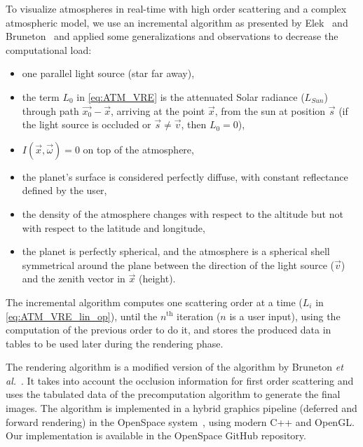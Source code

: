 \documentclass[journal]{vgtc}                %
\newcommand{\etal}{\emph{et al.}}
\newcommand{\review}[1]{{\color{blue}#1}}
\begin{document}
To visualize atmospheres in real-time with high order scattering and a complex atmospheric model, we use an incremental algorithm as presented by Elek~\cite{Elek:2009} and Bruneton~\cite{BrunetonNeyret:2008} and applied some generalizations and observations to decrease the computational load:
\begin{itemize}
	\vspace{-2.5mm}
	\item one parallel light source (star far away),
	\vspace{-2.5mm}
	\item the term $L_0$ in \autoref{eq:ATM_VRE} is the attenuated Solar radiance ($L_{Sun}$) through path $\vec{x_0}-\vec{x}$, arriving at the point $\vec{x}$, from the sun at position $\vec{s}$ (if the light source is occluded or $\vec{s} \neq \vec{v}$, then $L_0 = 0$),
	\vspace{-2.5mm}
	\item $I(\vec{x}, \vec{\omega}) = 0$ on top of the atmosphere,
	\vspace{-2.5mm}
	\item the planet's surface is considered perfectly diffuse, with constant reflectance defined by the user,
	\vspace{-2.5mm}
	\item the density of the atmosphere changes with respect to the altitude but not with respect to the latitude and longitude,
	\vspace{-2.5mm}
	\item the planet is perfectly spherical, and the atmosphere is a spherical shell symmetrical around the plane between the direction of the light source ($\vec{v}$) and the zenith vector in $\vec{x}$ (height).
	\vspace{-2.5mm}
\end{itemize}

The incremental algorithm computes one scattering order at a time ($L_i$ in \autoref{eq:ATM_VRE_lin_op}), until the $n^{\text{th}}$ iteration ($n$ is \review{a user input}), using the computation of the previous order to do it, and stores the produced data in tables to be used later during the rendering phase.

The rendering algorithm is a modified version of the algorithm by Bruneton \etal ~\cite{BrunetonNeyret:2008}. It takes into account the occlusion information for first order scattering and uses the tabulated data of the precomputation algorithm to generate the final images. The algorithm is implemented in a hybrid graphics pipeline (deferred and forward rendering) in the OpenSpace system~\cite{OpenSpace:2020, bock18openspace}, using modern C++ and OpenGL. Our implementation is available in the OpenSpace GitHub repository.
\end{document}
